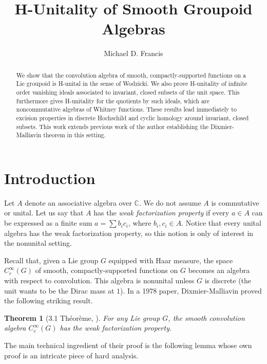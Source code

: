 \documentclass[12pt]{article}
\theoremstyle{plain}
\newtheorem{thm}{Theorem}[section]
\theoremstyle{definition}
\newcommand{\C}{\mathbb{C}}
\numberwithin{equation}{section}
\begin{document}
\title{H-Unitality of Smooth Groupoid Algebras}
\author{Michael D. Francis} 


\maketitle

\begin{abstract}
We show that the convolution algebra of smooth, compactly-supported functions on a Lie groupoid is H-unital in the sense of Wodzicki.  We also prove H-unitality of infinite order vanishing  ideals associated to invariant, closed subsets of the unit space. This furthermore gives H-unitality for the quotients by such ideals, which are noncommutative algebras of Whitney functions. These results lead immediately to excision properties in discrete Hochschild and cyclic homology around invariant, closed subsets. This work extends previous work of the author establishing the Dixmier-Malliavin theorem in this setting.
\end{abstract}



\section{Introduction}

Let $A$   denote an associative algebra over $\C$. We do not assume $A$ is commutative or unital. Let us say  that $A$ has the \emph{weak factorization property} if every $a \in A$ can be expressed as a finite sum $a = \sum b_i c_i$, where $b_i,c_i \in A$. Notice that every unital algebra has the weak factorization property, so this notion is only of interest in the nonunital setting.

Recall that, given a Lie group $G$ equipped with Haar measure, the space $C_c^\infty(G)$ of smooth, compactly-supported functions on $G$ becomes an algebra with respect to convolution. This algebra is nonunital unless $G$ is discrete (the unit wants to be the Dirac mass at $1$). In a 1978 paper, Dixmier-Malliavin proved the following striking result.


\begin{thm}[3.1 Th\'{e}or\`{e}me, \cite{Dixmier-Malliavin}]\label{DMthm}
For any Lie group $G$, the smooth convolution algebra  $C_c^\infty(G)$ has the weak factorization property.
\end{thm}



The main technical ingredient of their proof  is the following lemma whose own proof is an intricate piece of hard  analysis.
\end{document}

